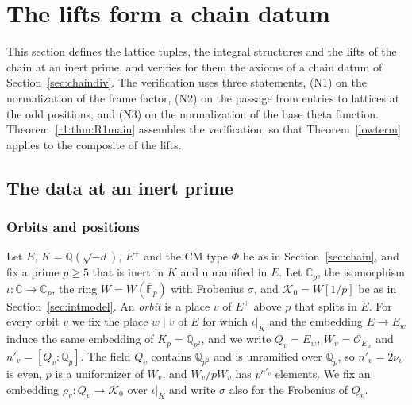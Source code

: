 \section{The lifts form a chain datum}\label{sec:lifts}

This section defines the lattice tuples, the integral structures and the lifts of the chain at an inert prime, and verifies for them the axioms of a chain datum of Section~\ref{sec:chaindiv}. The verification uses three statements, (N1) on the normalization of the frame factor, (N2) on the passage from entries to lattices at the odd positions, and (N3) on the normalization of the base theta function. Theorem~\ref{r1:thm:R1main} assembles the verification, so that Theorem~\ref{lowterm} applies to the composite of the lifts.

\subsection{The data at an inert prime}\label{r1:sec:R1data}

\subsubsection{Orbits and positions}

Let $E$, $K=\mathbb Q(\sqrt{-d})$, $E^+$ and the CM type $\Phi$ be as in Section~\ref{sec:chain}, and fix a prime $p\ge5$ that is inert in $K$ and unramified in $E$. Let $\mathbb C_p$, the isomorphism $\iota\colon\mathbb C\to\mathbb C_p$, the ring $W=W(\overline{\mathbb F}_p)$ with Frobenius $\sigma$, and $\mathcal K_0=W[1/p]$ be as in Section~\ref{sec:intmodel}. An \emph{orbit} is a place $v$ of $E^+$ above $p$ that splits in $E$. For every orbit $v$ we fix the place $w\mid v$ of $E$ for which $\iota|_K$ and the embedding $E\to E_w$ induce the same embedding of $K_p=\mathbb Q_{p^2}$, and we write $Q_v=E_w$, $W_v=\mathcal O_{E_w}$ and $n'_v=[Q_v:\mathbb Q_p]$. The field $Q_v$ contains $\mathbb Q_{p^2}$ and is unramified over $\mathbb Q_p$, so $n'_v=2\nu_v$ is even, $p$ is a uniformizer of $W_v$, and $W_v/pW_v$ has $p^{n'_v}$ elements. We fix an embedding $\rho_v\colon Q_v\to\mathcal K_0$ over $\iota|_{K}$ and write $\sigma$ also for the Frobenius of $Q_v$.

